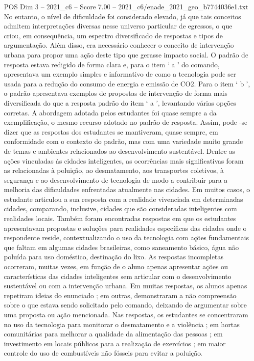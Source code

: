 \begin{textsample}{POS Dim 3 – 2021\_c6 – Score 7.00 – 2021\_c6/enade\_2021\_geo\_b7744036e1.txt}
No entanto, o nível de dificuldade foi considerado elevado, já que tais conceitos admitem interpretações diversas nesse universo particular de egressos, o que criou, em consequência, um espectro diversificado de respostas e tipos de argumentação.
Além disso, era necessário conhecer o conceito de intervenção urbana para propor uma ação deste tipo que gerasse impacto social.
O padrão de resposta estava redigido de forma clara e, para o item ‘ a ’ do comando, apresentava um exemplo simples e informativo de como a tecnologia pode ser usada para a redução do consumo de energia e emissão de CO2.
Para o item ‘ b ’, o padrão apresentava exemplos de propostas de intervenção de forma mais diversificada do que a resposta padrão do item ‘ a ’, levantando várias opções corretas.
A abordagem adotada pelos estudantes foi quase sempre a da exemplificação, o mesmo recurso adotado no padrão de resposta.
Assim, pode -se dizer que as respostas dos estudantes se mantiveram, quase sempre, em conformidade com o contexto do padrão, mas com uma variedade muito grande de temas e ambientes relacionados ao desenvolvimento sustentável.
Dentre as ações vinculadas às cidades inteligentes, as ocorrências mais significativas foram as relacionadas à poluição, ao desmatamento, aos transportes coletivos, à segurança e ao desenvolvimento de tecnologia de modo a contribuir para a melhoria das dificuldades enfrentadas atualmente nas cidades.
Em muitos casos, o estudante articulou a sua resposta com a realidade vivenciada em determinadas cidades, comparando, inclusive, cidades que são consideradas inteligentes com realidades locais.
Também foram encontradas respostas em que os estudantes apresentavam propostas e soluções para realidades específicas das cidades onde o respondente reside, contextualizando o uso da tecnologia com ações fundamentais que faltam em algumas cidades brasileiras, como saneamento básico, água não poluída para uso doméstico, destinação do lixo.
As respostas incompletas ocorreram, muitas vezes, em função de o aluno apenas apresentar ações ou características das cidades inteligentes sem articular com o desenvolvimento sustentável ou com a intervenção urbana.
Em muitas respostas, os alunos apenas repetiram ideias do enunciado ; em outras, demonstraram a não compreensão sobre o que estava sendo solicitado pelo comando, deixando de argumentar sobre uma proposta ou ação mencionada.
Nas respostas, os estudantes se concentraram no uso da tecnologia para monitorar o desmatamento e a violência ; em hortas comunitárias para melhorar a qualidade da alimentação das pessoas ; em investimento em locais públicos para a realização de exercícios ; em maior controle do uso de combustíveis não fósseis para evitar a poluição.

\end{textsample}
